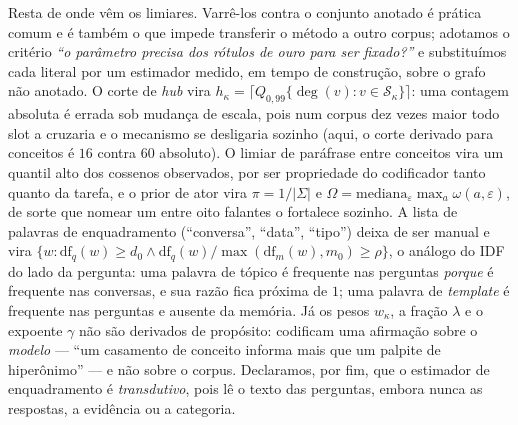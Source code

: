 Resta de onde vêm os limiares. Varrê-los contra o conjunto anotado é prática comum
e é também o que impede transferir o método a outro corpus; adotamos o critério
\emph{``o parâmetro precisa dos rótulos de ouro para ser fixado?''} e substituímos
cada literal por um estimador medido, em tempo de construção, sobre o grafo não
anotado. O corte de \emph{hub} vira $h_\kappa=\lceil Q_{0{,}99}\{\deg(v):v\in
\mathcal{S}_\kappa\}\rceil$: uma contagem absoluta é errada sob mudança de escala,
pois num corpus dez vezes maior todo slot a cruzaria e o mecanismo se desligaria
sozinho (aqui, o corte derivado para conceitos é $16$ contra $60$ absoluto). O
limiar de paráfrase entre conceitos vira um quantil alto dos cossenos observados,
por ser propriedade do codificador tanto quanto da tarefa, e o prior de ator vira
$\pi=1/|\Sigma|$ e $\Omega=\mathrm{mediana}_\varepsilon\max_a\omega(a,\varepsilon)$,
de sorte que nomear um entre oito falantes o fortalece sozinho. A lista de
palavras de enquadramento (``conversa'', ``data'', ``tipo'') deixa de ser manual e
vira $\{w:\mathrm{df}_q(w)\ge d_0 \wedge \mathrm{df}_q(w)/\max(\mathrm{df}_m(w),
m_0)\ge\rho\}$, o análogo do IDF do lado da pergunta: uma palavra de tópico é
frequente nas perguntas \emph{porque} é frequente nas conversas, e sua razão fica
próxima de $1$; uma palavra de \emph{template} é frequente nas perguntas e ausente
da memória. Já os pesos $w_\kappa$, a fração $\lambda$ e o expoente $\gamma$ não
são derivados de propósito: codificam uma afirmação sobre o \emph{modelo} --- ``um
casamento de conceito informa mais que um palpite de hiperônimo'' --- e não sobre
o corpus. Declaramos, por fim, que o estimador de enquadramento é
\emph{transdutivo}, pois lê o texto das perguntas, embora nunca as respostas, a
evidência ou a categoria.
